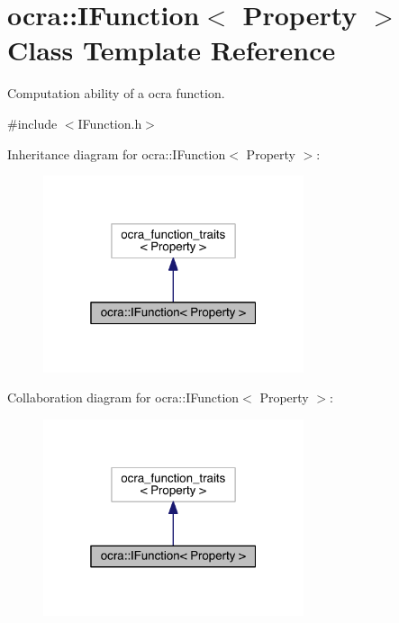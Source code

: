 \hypertarget{classocra_1_1IFunction}{}\section{ocra\+:\+:I\+Function$<$ Property $>$ Class Template Reference}
\label{classocra_1_1IFunction}


Computation ability of a ocra function.  




{\ttfamily \#include $<$I\+Function.\+h$>$}



Inheritance diagram for ocra\+:\+:I\+Function$<$ Property $>$\+:\nopagebreak
\begin{figure}[H]
\begin{center}
\leavevmode
\includegraphics[width=217pt]{d9/d48/classocra_1_1IFunction__inherit__graph}
\end{center}
\end{figure}


Collaboration diagram for ocra\+:\+:I\+Function$<$ Property $>$\+:\nopagebreak
\begin{figure}[H]
\begin{center}
\leavevmode
\includegraphics[width=217pt]{d9/d85/classocra_1_1IFunction__coll__graph}
\end{center}
\end{figure}

